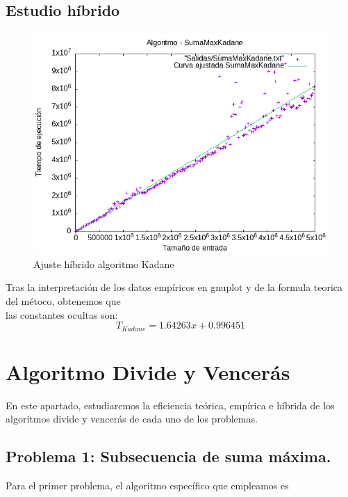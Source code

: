 \documentclass[11pt,openany]{book}
\begin{document}
  \section*{Estudio híbrido}
  \begin{figure}[h]
      \begin{minipage}{0.5\textwidth}
          \centering
          \includegraphics[width=\linewidth]{../Codigos/AjusteHibrido/SumaMaxKadane_hib.png}
          \caption{Ajuste híbrido algoritmo Kadane}
          \label{fig:mergesort}
      \end{minipage}
  \end{figure}
  Tras la interpretación de los datos empíricos en gnuplot y de la formula teorica del métoco, obtenemos que \\
  las constantes ocultas son:
  \begin{equation*}
      T_{Kadane}=1.64263x + 0.996451
  \end{equation*}
  

\chapter{Algoritmo Divide y Vencerás}
En este apartado, estudiaremos la eficiencia teórica, empírica e híbrida de los algoritmos divide y vencerás
de cada uno de los problemas.
\section{Problema 1: Subsecuencia de suma máxima.}
Para el primer problema, el algoritmo específico que empleamos es 
\end{document}
